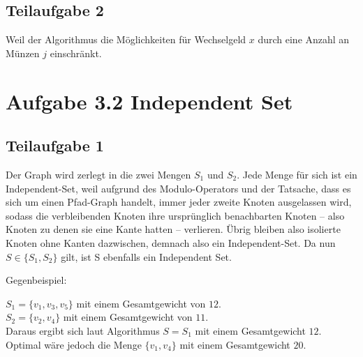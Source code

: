 \documentclass[a4paper, fontsize=10pt]{scrartcl}
\begin{document}
\subsection*{Teilaufgabe 2}
Weil der Algorithmus die Möglichkeiten für Wechselgeld $x$ durch eine Anzahl an Münzen $j$ einschränkt. 

\section*{Aufgabe 3.2 Independent Set}
\subsection*{Teilaufgabe 1}
Der Graph wird zerlegt in die zwei Mengen $S_1$ und $S_2$. Jede Menge für sich ist ein Independent-Set, weil aufgrund des Modulo-Operators und der Tatsache, dass es sich um einen Pfad-Graph handelt, immer jeder zweite Knoten ausgelassen wird, sodass die verbleibenden Knoten ihre ursprünglich benachbarten Knoten -- also Knoten zu denen sie eine Kante hatten -- verlieren. Übrig bleiben also isolierte Knoten ohne Kanten dazwischen, demnach also ein Independent-Set. Da nun $S\in \{S_1,S_2\}$ gilt, ist S ebenfalls ein Independent Set.\bigskip

Gegenbeispiel:\bigskip

\begin{center}
\end{center}
\bigskip

$S_1=\{v_1,v_3,v_5\}$ mit einem Gesamtgewicht von $12$.\\
$S_2=\{v_2,v_4\}$ mit einem Gesamtgewicht von $11$.\\Daraus ergibt sich laut Algorithmus $S=S_1$ mit einem Gesamtgewicht $12$. Optimal wäre jedoch die Menge $\{v_1,v_4\}$ mit einem Gesamtgewicht $20$.
\end{document}
